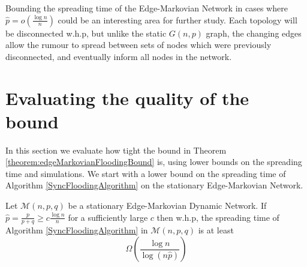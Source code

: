 Bounding the spreading time of the Edge-Markovian Network in cases where $\hat{p} = o(\frac{\log n}{n})$ could be an interesting area for further study. Each topology will be disconnected w.h.p, but unlike the static $G(n,p)$ graph, the changing edges allow the rumour to spread between sets of nodes which were previously disconnected, and eventually inform all nodes in the network.

\section{Evaluating the quality of the bound}\label{section:edgeMarkovianFloodingBoundEvaluation}


In this section we evaluate how tight the bound in Theorem \ref{theorem:edgeMarkovianFloodingBound} is, using lower bounds on the spreading time and simulations. %
We start with a lower bound on the spreading time of Algorithm \ref{SyncFloodingAlgorithm} on the stationary Edge-Markovian Network.

\begin{theorem}\label{theorem:edgeMarkovianLowerBound}
	Let $\mathcal{M}(n, p, q)$ be a stationary Edge-Markovian Dynamic Network. If $\hat{p} = \frac{p}{p+q} \geq c \frac{\log n}{n}$ for a sufficiently large $c$ then w.h.p, the spreading time of Algorithm \ref{SyncFloodingAlgorithm} in $\mathcal{M}(n, p, q)$ is at least 
	$$
		\Omega\left(\frac{\log n}{\log (n \hat{p})}\right)
	$$
\end{theorem}

